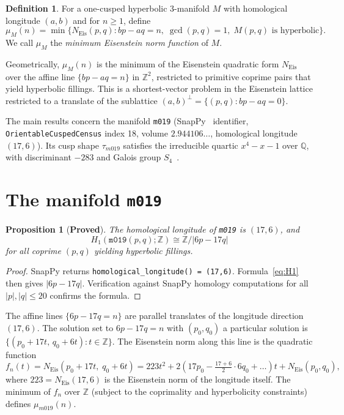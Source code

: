 \documentclass[11pt,a4paper]{article}
\newtheorem{proposition}[theorem]{Proposition}
\theoremstyle{definition}
\newtheorem{definition}[theorem]{Definition}
\theoremstyle{remark}
\newcommand{\Z}{\mathbb{Z}}
\newcommand{\Q}{\mathbb{Q}}
\newcommand{\mfld}[1]{\texttt{#1}}
\newcommand{\NEis}{N_{\mathrm{Eis}}}
\begin{document}
\begin{definition}\label{def:mu}
For a one-cusped hyperbolic 3-manifold $M$ with
homological longitude $(a,b)$ and for $n \geq 1$, define
\begin{equation}
\mu_M(n) = \min\bigl\{
  \NEis(p,q) :
  bp - aq = n,\;
  \gcd(p,q) = 1,\;
  M(p,q) \text{ is hyperbolic}
\bigr\}.
\label{eq:mu}
\end{equation}
We call $\mu_M$ the \emph{minimum Eisenstein norm function}
of $M$.
\end{definition}

Geometrically, $\mu_M(n)$ is the minimum of the
Eisenstein quadratic form $\NEis$ over the affine line
$\{bp - aq = n\}$ in $\Z^2$, restricted to primitive
coprime pairs that yield hyperbolic fillings.
This is a shortest-vector problem in the Eisenstein lattice
restricted to a translate of the sublattice
$(a,b)^\perp = \{(p,q) : bp - aq = 0\}$.

The main results concern the manifold \mfld{m019}
(SnapPy~\cite{SnapPy} identifier,
\texttt{OrientableCuspedCensus} index 18,
volume $2.944106\ldots$,
homological longitude $(17,6)$).
Its cusp shape $\tau_{m019}$ satisfies the irreducible
quartic $x^4 - x - 1$ over $\Q$,
with discriminant $-283$ and Galois group
$S_4$~\cite{GentryGalois}.

\section{The manifold \mfld{m019}}

\begin{proposition}[\textbf{Proved}]\label{prop:H1}
The homological longitude of \mfld{m019} is $(17,6)$,
and
\begin{equation}
H_1(\mfld{m019}(p,q);\Z) \cong \Z/|6p - 17q|
\label{eq:H1m019}
\end{equation}
for all coprime $(p,q)$ yielding hyperbolic fillings.
\end{proposition}

\begin{proof}
SnapPy returns \texttt{homological\_longitude() = (17,6)}.
Formula~\eqref{eq:H1} then gives $|6p - 17q|$.
Verification against SnapPy homology computations
for all $|p|,|q|\leq 20$ confirms the formula.
\end{proof}

The affine lines $\{6p - 17q = n\}$ are parallel translates
of the longitude direction $(17,6)$.
The solution set to $6p - 17q = n$ with $(p_0,q_0)$ a
particular solution is
$\{(p_0 + 17t,\, q_0 + 6t) : t \in \Z\}$.
The Eisenstein norm along this line is the quadratic function
\begin{equation}
f_n(t) = \NEis(p_0 + 17t,\; q_0 + 6t)
= 223t^2 + 2(17p_0 - \tfrac{17+6}{2}\cdot 6 q_0 + \ldots)t
+ \NEis(p_0,q_0),
\label{eq:quad}
\end{equation}
where $223 = \NEis(17,6)$ is the Eisenstein norm of the
longitude itself.
The minimum of $f_n$ over $\Z$ (subject to the coprimality
and hyperbolicity constraints) defines $\mu_{m019}(n)$.
\end{document}

